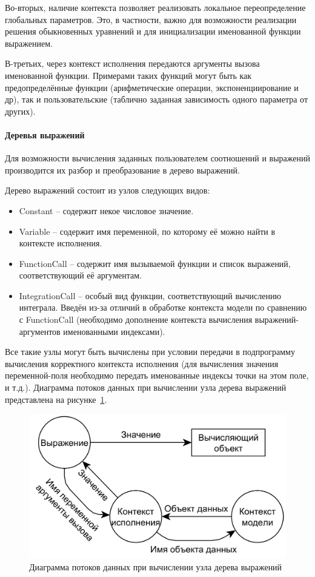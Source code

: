 Во-вторых, наличие контекста позволяет реализовать локальное переопределение 
глобальных параметров. Это, в частности, важно для возможности реализации 
решения обыкновенных уравнений и для инициализации именованной функции 
выражением.

В-третьих, через контекст исполнения передаются аргументы вызова именованной 
функции. Примерами таких функций могут быть как предопределённые функции 
(арифметические операции, экспоненциирование и др), так и пользовательские 
(таблично заданная зависимость одного параметра от других).

\paragraph{Деревья выражений}
Для возможности вычисления заданных пользователем соотношений и выражений 
производится их разбор и преобразование в дерево выражений.

Дерево выражений состоит из узлов следующих видов:
\begin{itemize}
    \item Constant -- содержит некое числовое значение.
    \item Variable -- содержит имя переменной, по которому её можно найти в 
    контексте исполнения.
    \item FunctionCall -- содержит имя вызываемой функции и список выражений, 
    соответствующий её аргументам.
    \item IntegrationCall -- особый вид функции, соответствующий вычислению 
    интеграла. Введён из-за отличий в обработке контекста модели по сравнению с 
    FunctionCall (необходимо дополнение контекста вычисления 
    выражений-аргументов именованными индексами).
\end{itemize}

Все такие узлы могут быть вычислены при условии передачи в подпрограмму 
вычисления корректного контекста исполнения (для вычисления значения 
переменной-поля необходимо передать именованные индексы точки на этом поле, и 
т.д.). Диаграмма потоков данных при вычислении узла дерева выражений 
представлена на рисунке~\ref{fig:expressionDfd}.

\begin{figure}
    \centering
    \includegraphics[width=.8\textwidth]{img/expression/dfd}
    \caption{Диаграмма потоков данных при вычислении узла дерева выражений}
    \label{fig:expressionDfd}
\end{figure}

